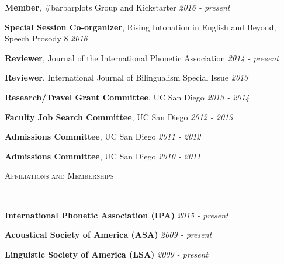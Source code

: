 \documentclass[9pt]{article}
\newenvironment{changemargin}[2]{%
  \begin{list}{}{%
    \setlength{\topsep}{0pt}%
    \setlength{\leftmargin}{#1}%
    \setlength{\rightmargin}{#2}%
    \setlength{\listparindent}{\parindent}%
    \setlength{\itemindent}{\parindent}%
    \setlength{\parsep}{\parskip}%
  }%
  \item[]}{\end{list}
}
\newcommand{\lineover}{
	\begin{changemargin}{-0.05in}{-0.05in}
		\vspace*{-8pt}
		\hrulefill \\
		\vspace*{-2pt}
	\end{changemargin}
}
\newcommand{\header}[1]{
	\begin{changemargin}{-0.5in}{-0.5in}
		\scshape{#1}\\
  	\lineover
	\end{changemargin}
}
\newenvironment{body} {
	\vspace*{-16pt}
	\begin{changemargin}{-0.25in}{-0.5in}
  }	
	{\end{changemargin}
}
\begin{document}
\begin{body}
	\vspace{14pt}
	
	\textbf{Member}, \#barbarplots Group and Kickstarter \hfill \emph{2016 - present} \\
	\medskip
	
	\textbf{Special Session Co-organizer}, Rising Intonation in English and Beyond, Speech Prosody 8 \hfill \emph{2016} \\
	\medskip
	
	\textbf{Reviewer}, Journal of the International Phonetic Association \hfill \emph{2014 - present} \\
	\medskip

	\textbf{Reviewer}, International Journal of Bilingualism Special Issue \hfill \emph{2013} \\
	\medskip
	
	\textbf{Research/Travel Grant Committee}, UC San Diego \hfill \emph{2013 - 2014} \\
	\medskip

	\textbf{Faculty Job Search Committee}, UC San Diego \hfill \emph{2012 - 2013} \\
	\medskip
	
	\textbf{Admissions Committee}, UC San Diego \hfill \emph{2011 - 2012} \\
	\medskip
	
	\textbf{Admissions Committee}, UC San Diego \hfill \emph{2010 - 2011} \\

\end{body}

\smallskip


\header{Affiliations and Memberships}

\begin{body}
	\vspace{14pt}
	
	\textbf{International Phonetic Association (IPA)} \hfill{} \emph{2015 - present}\\
	\medskip
	
	\textbf{Acoustical Society of America (ASA)} \hfill{} \emph{2009 - present}\\
	\medskip

	\textbf{Linguistic Society of America (LSA)} \hfill{} \emph{2009 - present}\\
	\medskip

\end{body}
\end{document}
